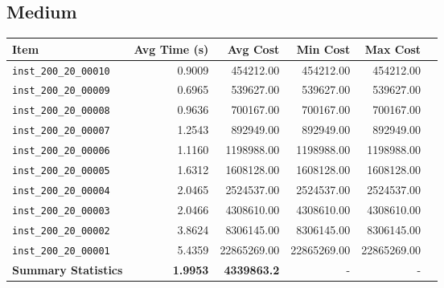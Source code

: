 \documentclass{article}
\begin{document}
\subsection*{Medium}
\begin{table}[H]
 	 \centering 
 	 \begin{tabular}{lrrrrr} 
 	 	\toprule 
 	 	\textbf{Item} & \textbf{Avg Time (s)} & \textbf{Avg Cost} & \textbf{Min Cost} & \textbf{Max Cost} \\ 
 	 	\midrule 
 	 	\texttt{inst\_200\_20\_00010} & 0.9009 & 454212.00 & 454212.00 & 454212.00  \\ \texttt{inst\_200\_20\_00009} & 0.6965 & 539627.00 & 539627.00 & 539627.00 \\ \texttt{inst\_200\_20\_00008} & 0.9636 & 700167.00 & 700167.00 & 700167.00 \\  \texttt{inst\_200\_20\_00007} & 1.2543 & 892949.00 & 892949.00 & 892949.00 \\  \texttt{inst\_200\_20\_00006} & 1.1160 & 1198988.00 & 1198988.00 & 1198988.00 \\  \texttt{inst\_200\_20\_00005} & 1.6312 & 1608128.00 & 1608128.00 & 1608128.00 \\  \texttt{inst\_200\_20\_00004} & 2.0465 & 2524537.00 & 2524537.00 & 2524537.00 \\  \texttt{inst\_200\_20\_00003} & 2.0466 & 4308610.00 & 4308610.00 & 4308610.00 \\  \texttt{inst\_200\_20\_00002} & 3.8624 & 8306145.00 & 8306145.00 & 8306145.00 \\  \texttt{inst\_200\_20\_00001} & 5.4359 & 22865269.00 & 22865269.00 & 22865269.00 \\ 
 	 	\midrule 
 	 	\textbf{Summary Statistics} & \textbf{1.9953} & \textbf{4339863.2} & - & - \\ 
 	 	\bottomrule
 	  \end{tabular}
 	  \label{tab:performance_metrics_medium_vnd}
\end{table}
\end{document}

